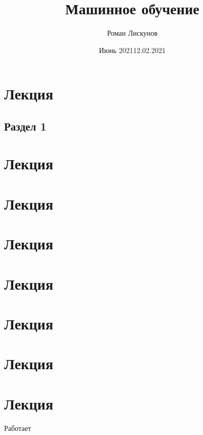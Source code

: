 \documentclass[a4paper,12pt]{report}
\author{Роман Лискунов}
\title{Машинное обучение}
\date{Июнь 2021}
\begin{document}
    \maketitle

    \tableofcontents{}
    \clearpage


    \chapter{Лекция}
    \date{12.02.2021}


    \section{Раздел 1}


    \chapter{Лекция}


    \chapter{Лекция}


    \chapter{Лекция}


    \chapter{Лекция}


    \chapter{Лекция}


    \chapter{Лекция}


    \chapter{Лекция}

    Работает
\end{document}
